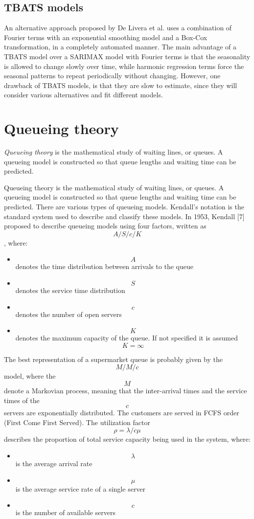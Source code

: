 \subsection{TBATS models}
\label{subsec:tbats_models}
An alternative approach proposed by De Livera et al. \cite{de_livera} uses a combination of Fourier terms with an exponential smoothing model and a Box-Cox transformation, in a completely automated manner. The main advantage of a TBATS model over a SARIMAX model with Fourier terms is that the seasonality is allowed to change slowly over time, while harmonic regression terms force the seasonal patterns to repeat periodically without changing. However, one drawback of TBATS models, is that they are slow to estimate, since they will consider various alternatives and fit different models.


\section{Queueing theory}
\label{sec:queueing_theory}

\emph{Queueing theory} is the mathematical study of waiting lines, or queues. A queueing model is constructed so that queue lengths and waiting time can be predicted.

Queueing theory is the mathematical study of waiting lines, or queues. A queueing model is constructed so that queue lengths and waiting time can be predicted. There are various types of queueing models. Kendall's notation is the standard system used to describe and classify these models. In 1953, Kendall [7] proposed to describe queueing models using four factors, written as $$ A/S/c/K $$, where:
\begin{itemize}
  \item $$ A $$ denotes the time distribution between arrivals to the queue
  \item $$ S $$ denotes the service time distribution
  \item $$ c $$ denotes the number of open servers
  \item $$ K $$ denotes the maximum capacity of the queue. If not specified it is assumed $$ K = \infty $$
\end{itemize}

The best representation of a supermarket queue is probably given by the $$ M/M/c $$ model, where the $$ M $$ denote a Markovian process, meaning that the inter-arrival times and the service times of the $$ c $$ servers are exponentially distributed. The customers are served in FCFS order (First Come First Served).
The utilization factor $$ \rho = \lambda/c\mu $$ describes the proportion of total service capacity being used in the system, where:
\begin{itemize}
  \item $$ \lambda $$ is the average arrival rate
  \item $$ \mu $$ is the average service rate of a single server
  \item $$ c $$ is the number of available servers
\end{itemize}

